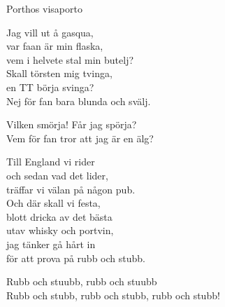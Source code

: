 \begin{song}{Porthos visa}{porto}
\begin{vers}
Jag vill ut å gasqua,\\
var faan är min flaska,\\
vem i helvete stal min butelj?\\
Skall törsten mig tvinga,\\
en TT börja svinga?\\
Nej för fan bara blunda och svälj.\\
\end{vers}
\begin{vers}
Vilken smörja! Får jag spörja?\\
Vem för fan tror att jag är en älg?\\
\end{vers}
\begin{vers}
Till England vi rider\\
och sedan vad det lider,\\
träffar vi välan på någon pub.\\
Och där skall vi festa,\\
blott dricka av det bästa\\
utav whisky och portvin,\\
jag tänker gå hårt in\\
för att prova på rubb och stubb.\\
\end{vers}
\begin{vers}
Rubb och stuubb, rubb och stuubb\\
Rubb och stubb, rubb och stubb, rubb och stubb!\\
\end{vers}
\end{song}
